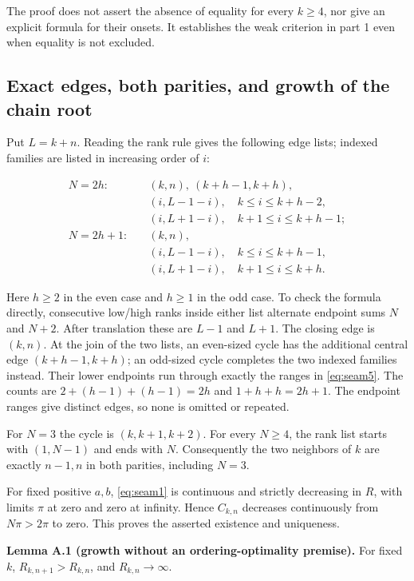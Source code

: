 The proof does not assert the absence of equality for every $k\ge4$,
nor give an explicit formula for their onsets. It establishes the weak
criterion in part 1 even when equality is not excluded.

\subsection{Exact edges, both parities, and growth of the chain root}

Put $L=k+n$. Reading the rank rule gives the following edge lists;
indexed families are listed in increasing order of $i$:

\[
\begin{array}{ll}
 N=2h:\quad &(k,n),\ (k+h-1,k+h),\\
 &(i,L-1-i),\quad k\le i\le k+h-2,\\
 &(i,L+1-i),\quad k+1\le i\le k+h-1;\\[2mm]
 N=2h+1:\quad &(k,n),\\
 &(i,L-1-i),\quad k\le i\le k+h-1,\\
 &(i,L+1-i),\quad k+1\le i\le k+h.
\end{array}
 \tag{A.5}\label{eq:seam5}
\]

Here $h\ge2$ in the even case and $h\ge1$ in the odd case. To
check the formula directly, consecutive low/high ranks inside either list
alternate endpoint sums $N$ and $N+2$. After translation these are
$L-1$ and $L+1$. The closing edge is $(k,n)$. At the join of
the two lists, an even-sized cycle has the additional central edge
$(k+h-1,k+h)$; an odd-sized cycle completes the two indexed families
instead. Their lower endpoints run through exactly the ranges in \eqref{eq:seam5}.
The counts are $2+(h-1)+(h-1)=2h$ and $1+h+h=2h+1$.
The endpoint ranges give distinct edges, so none is omitted or repeated.

For $N=3$ the cycle is $(k,k+1,k+2)$. For every $N\ge4$,
the rank list starts with $(1,N-1)$ and ends with $N$.
Consequently the two neighbors of $k$ are exactly $n-1,n$ in both
parities, including $N=3$.

For fixed positive $a,b$, \eqref{eq:seam1} is continuous and strictly decreasing in
$R$, with limits $\pi$ at zero and zero at infinity. Hence
$C_{k,n}$ decreases continuously from $N\pi>2\pi$ to zero.
This proves the asserted existence and uniqueness.

\textbf{Lemma A.1 (growth without an ordering-optimality premise).} For fixed
$k$, $R_{k,n+1}>R_{k,n}$, and $R_{k,n}\to\infty$.


